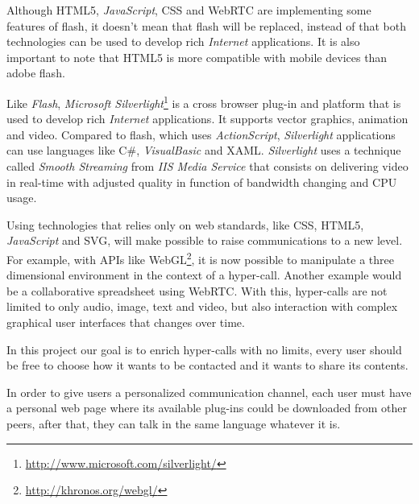   Although \ac{HTML}5, \textit{JavaScript}, \ac{CSS} and \ac{WebRTC} are implementing some features of flash, it doesn't mean that flash will be replaced, instead of that both technologies can be used to develop rich \textit{Internet} applications. It is also important to note that \ac{HTML}5 is more compatible with mobile devices than adobe flash. 

  Like \textit{Flash}, \textit{Microsoft Silverlight}\footnote{\url{http://www.microsoft.com/silverlight/}} is a cross browser plug-in and platform that is used to develop rich \textit{Internet} applications. It supports vector graphics, animation and video. Compared to flash, which uses \textit{ActionScript}, \textit{Silverlight} applications can use languages like C\#, \textit{VisualBasic} and \ac{XAML}. \textit{Silverlight} uses a technique called \textit{Smooth Streaming} from \textit{IIS Media Service} that consists on delivering video in real-time with adjusted quality in function of bandwidth changing and \ac{CPU} usage.

  Using technologies that relies only on web standards, like \ac{CSS}, \ac{HTML}5, \textit{JavaScript} and \ac{SVG}, will make possible to raise communications to a new level. For example, with \ac{API}s like WebGL\footnote{\url{http://khronos.org/webgl/}}, it is now possible to manipulate a three dimensional environment in the context of a hyper-call. Another example would be a collaborative spreadsheet using \ac{WebRTC}. With this, hyper-calls are not limited to only audio, image, text and video, but also interaction with complex graphical user interfaces that changes over time.

  In this project our goal is to enrich hyper-calls with no limits, every user should be free to choose how it wants to be contacted and it wants to share its contents.

  In order to give users a personalized communication channel, each user must have a personal web page where its available plug-ins could be downloaded from other peers, after that, they can talk in the same language whatever it is.
